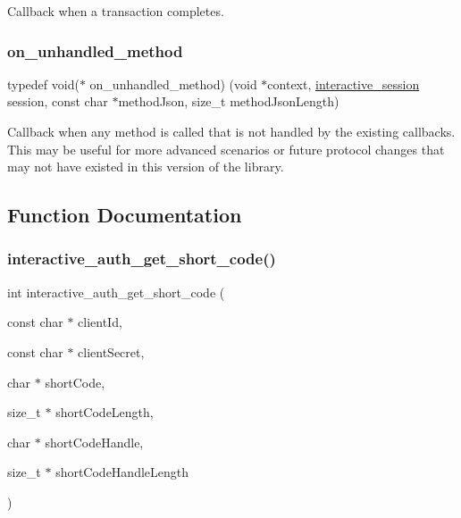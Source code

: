 Callback when a transaction completes. 

\mbox{\label{group___interactivity_ga1f1661f615bd28112daad64f95103a6a}} 
\subsubsection{\texorpdfstring{on\+\_\+unhandled\+\_\+method}{on\_unhandled\_method}}
{\footnotesize\ttfamily typedef void($\ast$ on\+\_\+unhandled\+\_\+method) (void $\ast$context, \mbox{\hyperlink{group___interactivity_ga6d8819d38b8dc8994a2299cf22a65a31}{interactive\+\_\+session}} session, const char $\ast$method\+Json, size\+\_\+t method\+Json\+Length)}



Callback when any method is called that is not handled by the existing callbacks. This may be useful for more advanced scenarios or future protocol changes that may not have existed in this version of the library. 



\subsection{Function Documentation}
\mbox{\label{group___interactivity_ga933fa6f40b4d9728b20286badcf0b4f5}} 
\subsubsection{\texorpdfstring{interactive\+\_\+auth\+\_\+get\+\_\+short\+\_\+code()}{interactive\_auth\_get\_short\_code()}}
{\footnotesize\ttfamily int interactive\+\_\+auth\+\_\+get\+\_\+short\+\_\+code (\begin{DoxyParamCaption}\item[{const char $\ast$}]{client\+Id,  }\item[{const char $\ast$}]{client\+Secret,  }\item[{char $\ast$}]{short\+Code,  }\item[{size\+\_\+t $\ast$}]{short\+Code\+Length,  }\item[{char $\ast$}]{short\+Code\+Handle,  }\item[{size\+\_\+t $\ast$}]{short\+Code\+Handle\+Length }\end{DoxyParamCaption})}



